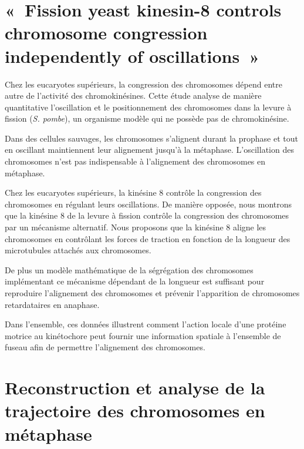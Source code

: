 \documentclass[12pt,a4paper,twoside,openright]{book}
\begin{document}
\section{«~Fission yeast kinesin-8 controls chromosome congression
independently of oscillations~»}\label{sec:article}

Chez les eucaryotes supérieurs, la congression des chromosomes dépend
entre autre de l'activité des chromokinésines. Cette étude analyse de
manière quantitative l'oscillation et le positionnement des chromosomes
dans la levure à fission (\emph{S. pombe}), un organisme modèle qui ne
possède pas de chromokinésine.

Dans des cellules sauvages, les chromosomes s'alignent durant la
prophase et tout en oscillant maintiennent leur alignement jusqu'à la
métaphase. L'oscillation des chromosomes n'est pas indispensable à
l'alignement des chromosomes en métaphase.

Chez les eucaryotes supérieurs, la kinésine 8 contrôle la congression
des chromosomes en régulant leurs oscillations. De manière opposée, nous
montrons que la kinésine 8 de la levure à fission contrôle la
congression des chromosomes par un mécanisme alternatif. Nous proposons
que la kinésine 8 aligne les chromosomes en contrôlant les forces de
traction en fonction de la longueur des microtubules attachés aux
chromosomes.

De plus un modèle mathématique de la ségrégation des chromosomes
implémentant ce mécanisme dépendant de la longueur est suffisant pour
reproduire l'alignement des chromosomes et prévenir l'apparition de
chromosomes retardataires en anaphase.

Dans l'ensemble, ces données illustrent comment l'action locale d'une
protéine motrice au kinétochore peut fournir une information spatiale à
l'ensemble de fuseau afin de permettre l'alignement des chromosomes.





\section{Reconstruction et analyse de la trajectoire des chromosomes en
métaphase}\label{reconstruction-et-analyse-de-la-trajectoire-des-chromosomes-en-muxe9taphase}
\end{document}

